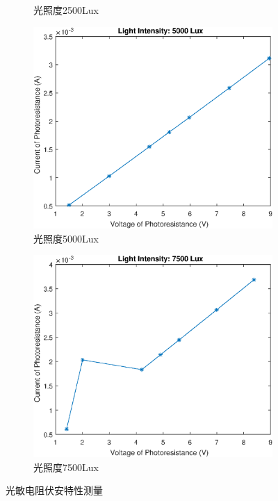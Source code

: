 \documentclass{ctexart}
\begin{document}
\begin{figure}[H]
\begin{subfigure}{.45\textwidth}
    \caption{光照度2500Lux}
  \end{subfigure}
  \begin{subfigure}{.45\textwidth}
    \centering
    \includegraphics[width=\linewidth]{光电传感器综合实验图像/photoresistor_5000Lux}
    \caption{光照度5000Lux}
  \end{subfigure}
  \begin{subfigure}{.45\textwidth}
    \centering
    \includegraphics[width=\linewidth]{光电传感器综合实验图像/photoresistor_7500Lux}
    \caption{光照度7500Lux}
  \end{subfigure}
  \caption{光敏电阻伏安特性测量}
\end{figure}
\end{document}
